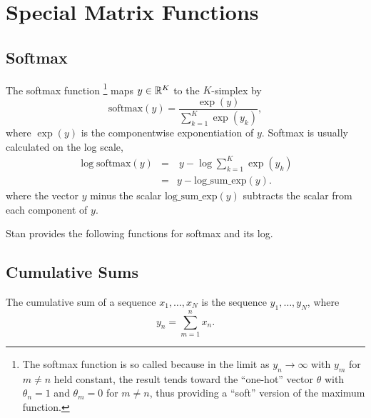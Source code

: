 \section{Special Matrix Functions}\label{softmax.section}

\subsection{Softmax}

The softmax function%
%
\footnote{The softmax function is so called because in the limit as
  $y_n \rightarrow \infty$ with $y_m$ for $m \neq n$ held constant,
  the result tends toward the ``one-hot'' vector $\theta$ with
  $\theta_n = 1$ and $\theta_m = 0$ for $m \neq n$, thus providing a
  ``soft'' version of the maximum function.}  
maps $y \in \mathbb{R}^K$ to the $K$-simplex by
\[
\mbox{softmax}(y)
 = \frac{\exp(y)}
        {\sum_{k=1}^K \exp(y_k)},
\]
%
where $\exp(y)$ is the componentwise exponentiation of $y$.
%
Softmax is usually calculated on the log scale, 
%
\begin{eqnarray*}
\log \mbox{softmax}(y)
& = & \ y - \log \sum_{k=1}^K \exp(y_k)
\\[4pt]
& = & y - \mbox{log\_sum\_exp}(y).
\end{eqnarray*}
%
where the vector $y$ minus the scalar $\mbox{log\_sum\_exp}(y)$
subtracts the scalar from each component of $y$.

Stan provides the following functions for softmax and its log.
%
\begin{description}
%
\end{description}
%

\subsection{Cumulative Sums}

The cumulative sum of a sequence $x_1,\ldots,x_N$ is the 
sequence $y_1,\ldots,y_N$, where 
%
\[
y_n = \sum_{m = 1}^{n} x_n.
\]

\begin{description}
%
%
%
%
\end{description}




